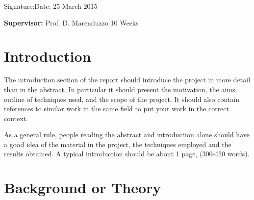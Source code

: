 \documentclass[a4paper,12pt]{article}
\begin{document}
\vspace*{2cm}
Signature:\hspace*{8cm}Date: 25 March 2015

\vfill
{\bf Supervisor:} Prof. D. Marenduzzo                 %
\hfill
10 Weeks                                         %
\newpage
%
\pagestyle{plain}                               %
\setcounter{page}{1}                            %
\tableofcontents                                %

\break
\section{Introduction}

The introduction section of the report should introduce the project in
more detail than in the abstract. In particular it should present the
motivation, the aims, outline of techniques used, and the scope of the project. 
It should also contain references to similar work in the
same field to put your work in the correct context.

As a general rule, people reading the abstract and introduction alone
should have a good idea of the material in the project, the techniques
employed and the results obtained. A typical introduction should be
about 1 page, (300-450 words). 

\pagebreak
\section{Background or Theory}

%
%
\end{document}
